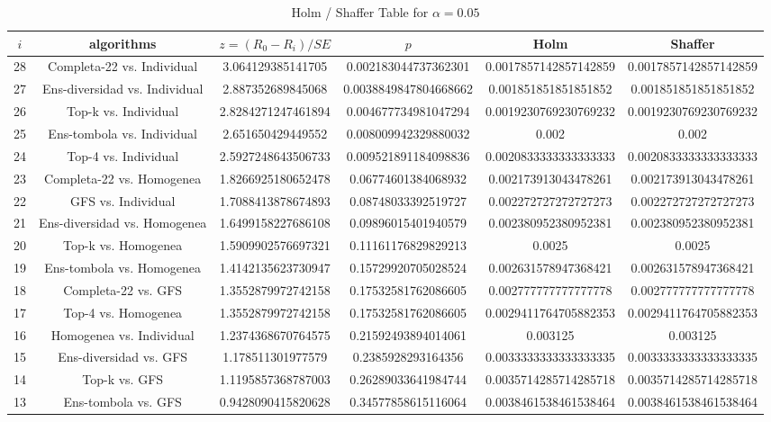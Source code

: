 \documentclass[a4paper,10pt]{article}
\begin{document}
\begin{landscape}
\begin{table}[!htp]
\centering\tiny
\caption{Holm / Shaffer Table for $\alpha=0.05$}
\begin{tabular}{cccccc}
$i$&algorithms&$z=(R_0 - R_i)/SE$&$p$&Holm&Shaffer\\
\hline
28&Completa-22 vs. Individual&3.064129385141705&0.002183044737362301&0.0017857142857142859&0.0017857142857142859\\
27&Ens-diversidad vs. Individual&2.887352689845068&0.0038849847804668662&0.001851851851851852&0.001851851851851852\\
26&Top-k vs. Individual&2.8284271247461894&0.004677734981047294&0.0019230769230769232&0.0019230769230769232\\
25&Ens-tombola vs. Individual&2.651650429449552&0.008009942329880032&0.002&0.002\\
24&Top-4 vs. Individual&2.5927248643506733&0.009521891184098836&0.0020833333333333333&0.0020833333333333333\\
23&Completa-22 vs. Homogenea&1.8266925180652478&0.06774601384068932&0.002173913043478261&0.002173913043478261\\
22&GFS vs. Individual&1.7088413878674893&0.08748033392519727&0.002272727272727273&0.002272727272727273\\
21&Ens-diversidad vs. Homogenea&1.6499158227686108&0.09896015401940579&0.002380952380952381&0.002380952380952381\\
20&Top-k vs. Homogenea&1.5909902576697321&0.11161176829829213&0.0025&0.0025\\
19&Ens-tombola vs. Homogenea&1.4142135623730947&0.15729920705028524&0.002631578947368421&0.002631578947368421\\
18&Completa-22 vs. GFS&1.3552879972742158&0.17532581762086605&0.002777777777777778&0.002777777777777778\\
17&Top-4 vs. Homogenea&1.3552879972742158&0.17532581762086605&0.0029411764705882353&0.0029411764705882353\\
16&Homogenea vs. Individual&1.2374368670764575&0.21592493894014061&0.003125&0.003125\\
15&Ens-diversidad vs. GFS&1.178511301977579&0.2385928293164356&0.0033333333333333335&0.0033333333333333335\\
14&Top-k vs. GFS&1.1195857368787003&0.26289033641984744&0.0035714285714285718&0.0035714285714285718\\
13&Ens-tombola vs. GFS&0.9428090415820628&0.34577858615116064&0.0038461538461538464&0.0038461538461538464\\

\end{tabular}
\end{table}
\end{landscape}
\end{document}
